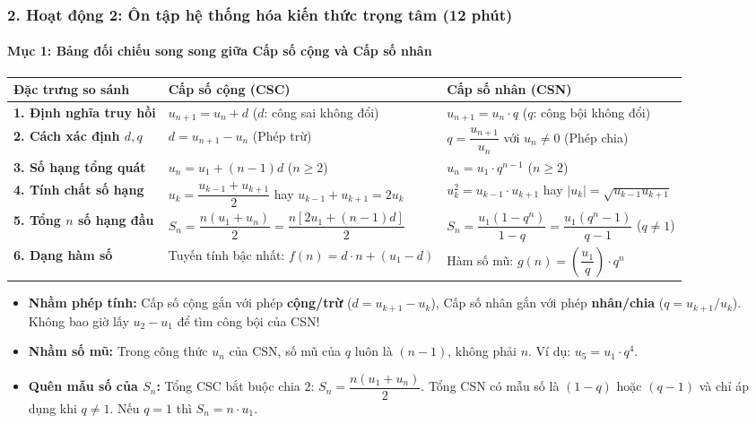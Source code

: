 \documentclass[12pt, a4paper]{article}
\begin{document}
\subsubsection*{2. Hoạt động 2: Ôn tập hệ thống hóa kiến thức trọng tâm (12 phút)}

\paragraph{Mục 1: Bảng đối chiếu song song giữa Cấp số cộng và Cấp số nhân}

\begin{center}
\begin{tabularx}{\linewidth}{|l|X|X|}
\hline
\textbf{Đặc trưng so sánh} & \textbf{Cấp số cộng (CSC)} & \textbf{Cấp số nhân (CSN)} \\
\hline
\textbf{1. Định nghĩa truy hồi} & $u_{n+1} = u_n + d$ ($d$: công sai không đổi) & $u_{n+1} = u_n \cdot q$ ($q$: công bội không đổi) \\
\hline
\textbf{2. Cách xác định $d, q$} & $d = u_{n+1} - u_n$ (Phép trừ) & $q = \dfrac{u_{n+1}}{u_n}$ với $u_n \neq 0$ (Phép chia) \\
\hline
\textbf{3. Số hạng tổng quát} & $u_n = u_1 + (n - 1)d$ ($n \ge 2$) & $u_n = u_1 \cdot q^{n-1}$ ($n \ge 2$) \\
\hline
\textbf{4. Tính chất số hạng} & $u_k = \dfrac{u_{k-1} + u_{k+1}}{2}$ hay $u_{k-1} + u_{k+1} = 2u_k$ & $u_k^2 = u_{k-1} \cdot u_{k+1}$ hay $|u_k| = \sqrt{u_{k-1} u_{k+1}}$ \\
\hline
\textbf{5. Tổng $n$ số hạng đầu} & $S_n = \dfrac{n(u_1 + u_n)}{2} = \dfrac{n[2u_1 + (n - 1)d]}{2}$ & $S_n = \dfrac{u_1(1 - q^n)}{1 - q} = \dfrac{u_1(q^n - 1)}{q - 1}$ ($q \neq 1$) \\
\hline
\textbf{6. Dạng hàm số} & Tuyến tính bậc nhất: $f(n) = d \cdot n + (u_1 - d)$ & Hàm số mũ: $g(n) = \left(\dfrac{u_1}{q}\right) \cdot q^n$ \\
\hline
\end{tabularx}
\end{center}

\begin{scaffoldbox}
    \begin{itemize}
        \item \textbf{Nhầm phép tính:} Cấp số cộng gắn với phép \textbf{cộng/trừ} ($d = u_{k+1} - u_k$), Cấp số nhân gắn với phép \textbf{nhân/chia} ($q = u_{k+1} / u_k$). Không bao giờ lấy $u_2 - u_1$ để tìm công bội của CSN!
        \item \textbf{Nhầm số mũ:} Trong công thức $u_n$ của CSN, số mũ của $q$ luôn là $(n - 1)$, không phải $n$. Ví dụ: $u_5 = u_1 \cdot q^4$.
        \item \textbf{Quên mẫu số của $S_n$:} Tổng CSC bắt buộc chia $2$: $S_n = \dfrac{n(u_1 + u_n)}{2}$. Tổng CSN có mẫu số là $(1 - q)$ hoặc $(q - 1)$ và chỉ áp dụng khi $q \neq 1$. Nếu $q = 1$ thì $S_n = n \cdot u_1$.
    \end{itemize}
\end{scaffoldbox}
\end{document}
